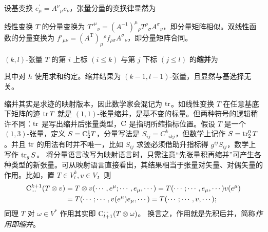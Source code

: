 \begin{theorem}
    设基变换 $e_\mu^{\prime}=A^\nu{ }_\mu e_\nu$，张量分量的变换律显然为
\end{theorem}
\begin{eg}
    线性变换 $T$ 的分量变换为 $T'^\mu{}_\nu= (A^{-1})^\mu{}_\rho T^\rho{}_\sigma A^\sigma{}_\nu$，即分量矩阵相似。双线性函数的分量变换为 $f'_{\mu\nu}=(A^\mathrm{T})_\mu{}^\rho f_{\rho\sigma} A^\sigma{}_\nu$，即分量矩阵合同。
\end{eg}

\begin{definition}
    $(k,l)$-张量 $ T $ 的第 $i$ 上标 $(i \leqslant k)$ 与第 $j$ 下标 $(j \leqslant l)$ 的\textbf{缩并}为
\vspace{-0.1\baselineskip}

\noindent 其中对 $h$ 使用求和约定。缩并结果为 $(k-1,l-1)$-张量，且显然与基选择无关。
\end{definition}

缩并其实是求迹的映射版本，因此数学家会混记为 $\tr$。如线性变换 $T$ 在任意基底下矩阵的迹 $\tr T$ 就是 $(1,1)$-张量缩并，是基不变的标量。但两种符号的逻辑稍许不同：$\tr$ 是写出缩并后张量类型，$\mathrm{C}$ 是指明所缩指标位置。假设 $T$ 是一个 $(1,3)$-张量，定义 $S=\mathrm{C}^1_{2}T$，分量写法是 $S_{ij}=C^{k}{}_{ikj}$，但数学上记作 $S=\tr^0_2 T$。并且 $\tr$ 的用法有时并不唯一，比如 $S_{ij}$ 求迹必须借助升指标得 $g^{ij}S_{ij}$，数学上写作 $\tr_{g}S$。
将分量语言改写为映射语言时，只需注意“先张量积再缩并”可产生各种类型的新张量。可从映射语言直接看出，其结果相当于张量对矢量、对偶矢量的作用。比如，置 $T \in V^k_l,v \in V$，则
\begin{align*}
    \mathrm{C}_{\cdots}^{k+1}(T \otimes v)&=T \otimes v(\cdots,e^{\mu} ; \cdots,e_{\mu},\cdots)=T(\cdots;\cdots,e_{\mu},\cdots)v(e^\mu)\\
    &=T(\cdots;\cdots,v(e^\mu)e_{\mu},\cdots)=T(\cdots;\cdots,v,\cdots);
\end{align*}
同理 $T$ 对 $\omega\in V^*$ 作用其实即 $\mathrm{C}_{l+1}^{\cdots}(T \otimes \omega)$。
换言之，作用就是先积后并，简称\textit{作用即缩并}。


